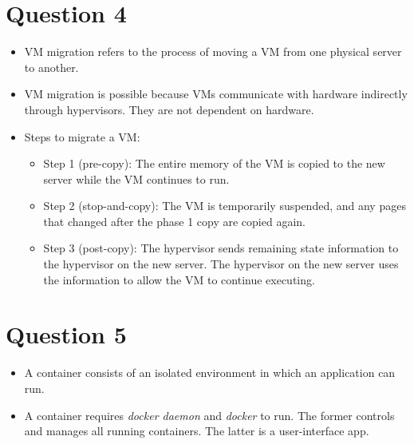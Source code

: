 \documentclass{article}
\begin{document}
\section{Question 4}
\begin{itemize}
\item VM migration refers to the process of moving a VM from one physical server to another.
\item VM migration is possible because VMs communicate with hardware indirectly through hypervisors. They are not dependent on hardware.
\item Steps to migrate a VM:
    \begin{itemize}
    \item Step 1 (pre-copy): The entire memory of the VM is copied to the new server while the VM continues to run.
    \item Step 2 (stop-and-copy): The VM is temporarily suspended, and any pages that changed after the phase 1 copy are copied again.
    \item Step 3 (post-copy): The hypervisor sends remaining state information
to the hypervisor on the new server. The hypervisor on the new server uses the information to allow the VM to continue executing.
    \end{itemize}
\end{itemize}


\section{Question 5}
\begin{itemize}
\item A container consists of an isolated environment in which an application
can run.
\item A container requires \textit{docker daemon} and \textit{docker} to run. The former controls and manages all running containers. The latter is a user-interface app.
\end{itemize}
\end{document}
